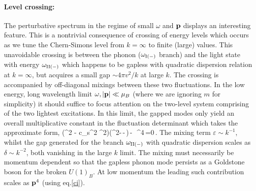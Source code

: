 \paragraph{Level crossing:} The perturbative spectrum in the regime of small $\omega$ and ${\bf p}$ displays an interesting feature. This is a nontrivial consequence of crossing of energy levels which occurs as we tune the Chern-Simons level from $k=\infty$ to finite (large) values. This unavoidable crossing is between the phonon ($\omega_{\rm I (-)}$  branch) and the light state with energy $\omega_{\rm II(-)}$ which happens to be gapless with quadratic dispersion relation at $k=\infty$, but acquires a small gap $\sim 4\pi v^2/k$ at large $k$.  The crossing is accompanied by off-diagonal mixings between these two fluctuations. In the low energy, long wavelength limit $\omega, |{\bf p}| \ll \mu_B$ (where we are ignoring  $m$ for simplicity) it should suffice to focus attention on the two-level system comprising of the two lightest excitations. In this limit, the gapped modes only yield an overall multiplicative constant in the fluctuation determinant which takes the approximate form,
\be
\left(\omega^2 - c_s^2 \p^2\right)\left(\omega^2-\,-\,\delta\right)\,-\,\varepsilon\, \p^4\,=0\,.\label{mixing}
\ee
The mixing term $\varepsilon\sim k^{-1}$, whilst  the gap generated for the branch $\omega_{\rm II(-)}$ with quadratic dispersion scales as  $\delta\sim k^{-2}$,  both  vanishing in the large $k$ limit.  The mixing must necessarily be momentum dependent so that the gapless phonon mode persists as a Goldstone boson for the broken $U(1)_B$. At low momentum the leading such contribution scales as ${\bf p}^4$ (using eq.\eqref{ci}). 
